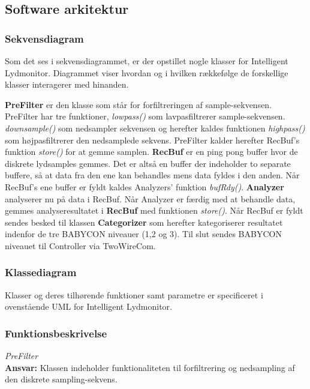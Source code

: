 \newpage
\subsection{Software arkitektur}
\subsubsection*{Sekvensdiagram}

Som det ses i sekvensdiagrammet, er der opstillet nogle klasser for Intelligent Lydmonitor. Diagrammet viser hvordan og i hvilken rækkefølge de forskellige klasser interagerer med hinanden. 

\textbf{PreFilter} er den klasse som står for forfiltreringen af sample-sekvensen. PreFilter har tre funktioner, \textit{lowpass()} som lavpasfiltrerer sample-sekvensen. \textit{downsample()} som nedsampler sekvensen og herefter kaldes funktionen \textit{highpass()} som højpasfiltrerer den nedsamplede sekvens. PreFilter kalder herefter RecBuf's funktion \textit{store()} for at gemme samplen.
\textbf{RecBuf} er en ping pong buffer hvor de diskrete lydsamples gemmes. Det er altså en buffer der indeholder to separate buffere, så at data fra den ene kan behandles mens data fyldes i den anden. Når RecBuf's ene buffer er fyldt kaldes Analyzers' funktion \textit{bufRdy()}. \textbf{Analyzer} analyserer nu på data i RecBuf. Når Analyzer er færdig med at behandle data, gemmes analyseresultatet i \textbf{RecBuf} med funktionen \textit{store()}. Når RecBuf er fyldt sendes besked til klassen \textbf{Categorizer} som herefter kategoriserer resultatet indenfor de tre BABYCON niveauer (1,2 og 3). 
Til slut sendes BABYCON niveauet til Controller via TwoWireCom. 

\subsubsection*{Klassediagram}
Klasser og deres tilhørende funktioner samt parametre er specificeret i ovenstående UML for Intelligent Lydmonitor. 

\subsubsection*{Funktionsbeskrivelse}

\textit{PreFilter} \\
\textbf{Ansvar:} Klassen indeholder funktionaliteten til forfiltrering og nedsampling af den diskrete sampling-sekvens.


